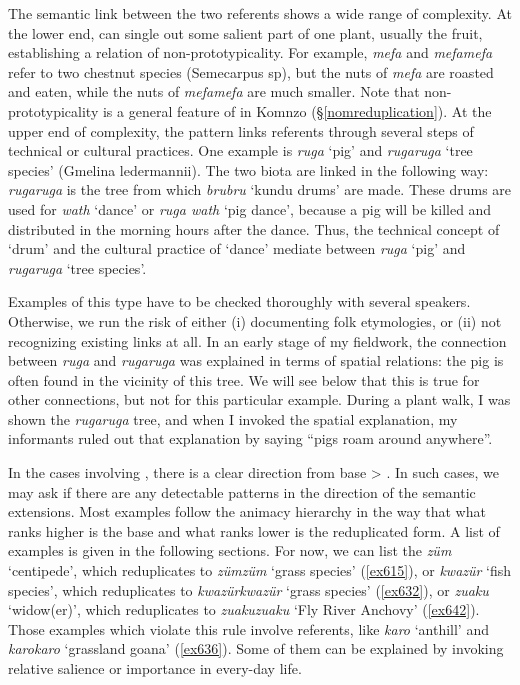 The semantic link between the two referents shows a wide range of complexity. At the lower end,  can single out some salient part of one plant, usually the fruit, establishing a relation of non-prototypicality. For example, \emph{mefa} and \emph{mefamefa} refer to two chestnut species (Semecarpus sp), but the nuts of \emph{mefa} are roasted and eaten, while the nuts of \emph{mefamefa} are much smaller. Note that non-prototypicality is a general feature of  in Komnzo ({\S}\ref{nomreduplication}). At the upper end of complexity, the  pattern links referents through several steps of technical or cultural practices. One example is \emph{ruga} `pig' and \emph{rugaruga} `tree species' (Gmelina ledermannii). The two biota are linked in the following way: \emph{rugaruga} is the tree from which \emph{brubru} `kundu drums' are made. These drums are used for \emph{wath} `dance' or \emph{ruga wath} `pig dance', because a pig will be killed and distributed in the morning hours after the dance. Thus, the technical concept of `drum' and the cultural practice of `dance' mediate between \emph{ruga} `pig' and \emph{rugaruga} `tree species'.

Examples of this type have to be checked thoroughly with several speakers. Otherwise, we run the risk of either (i) documenting folk etymologies, or (ii) not recognizing existing links at all. In an early stage of my fieldwork, the connection between \emph{ruga} and \emph{rugaruga} was explained in terms of spatial relations: the pig is often found in the vicinity of this tree. We will see below that this is true for other connections, but not for this particular example. During a plant walk, I was shown the \emph{rugaruga} tree, and when I invoked the spatial explanation, my informants ruled out that explanation by saying ``pigs roam around anywhere''.

In the cases involving , there is a clear direction from base > . In such cases, we may ask if there are any detectable patterns in the direction of the semantic extensions. Most examples follow the animacy hierarchy in the way that what ranks higher is the base and what ranks lower is the reduplicated form. A list of examples is given in the following sections. For now, we can list the \emph{züm} `centipede', which reduplicates to \emph{zümzüm} `grass species' (\ref{ex615}), or \emph{kwazür} `fish species', which reduplicates to \emph{kwazürkwazür} `grass species' (\ref{ex632}), or \emph{zuaku} `widow(er)', which reduplicates to \emph{zuakuzuaku} `Fly River Anchovy' (\ref{ex642}). Those examples which violate this rule involve  referents, like \emph{karo} `anthill' and \emph{karokaro} `grassland goana' (\ref{ex636}). Some of them can be explained by invoking relative salience or importance in every-day life.

